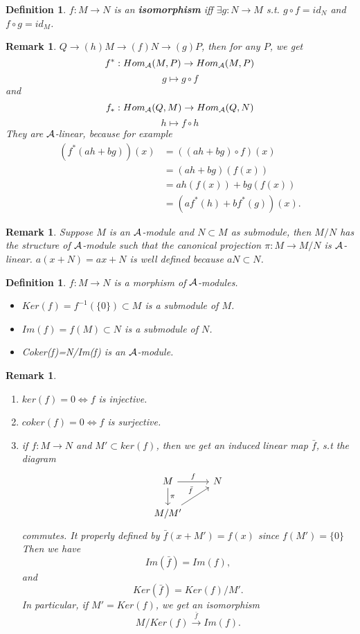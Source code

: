 \documentclass[11pt]{article}
\newtheorem{dfn}[thm]{Definition}
\newtheorem{rmk}[thm]{Remark}
\newcommand{\cala}{{\cal A}}
\newcommand{\rta}{\rightarrow}
\newcommand{\lrta}{\longrightarrow}
\begin{document}
\begin{dfn}
$f:M\rta N$ is an \textbf{isomorphism} iff $\exists g:N\lrta M$ s.t. $g\circ f=id_N$ and $f\circ g=id_M$.
\end{dfn}
\begin{rmk}
$Q\rta(h) M\rta(f) N\rta(g) P$, then for any $P$, we get
 $$
 f^*: Hom_\cala(M,P)\rta Hom_\cala(M,P)
 $$
 $$
g\mapsto g\circ f
 $$
 and 
 $$
 f_*: Hom_\cala(Q,M)\rta Hom_\cala(Q,N)
 $$
 $$
h\mapsto  f\circ h
 $$
They are $\cala$-linear, because for example
$$
\begin{aligned}
(f^*(a h+b g))(x)&=((a h+b g)\circ f) (x)\\
&= (a h+b g) (f(x))\\
&=a h(f(x))+bg(f(x))\\
&= (a f^*(h)+b f^* (g))(x).
\end{aligned}
$$
\end{rmk}

\begin{rmk}
Suppose $M$ is an $\cala$-module and $N\subset M$ as submodule, then $M/N$ has the structure of $\cala$-module such that the canonical projection $\pi: M\rta M/N$ is $\cala$-linear. $a(x+N)=ax+N$ is well defined because $a N\subset N$.
\end{rmk}
\begin{dfn}$f: M\lrta N$ is a morphism of $\cala$-modules.\\
\begin{itemize}
\item 
$
Ker(f)=f^{-1}(\{0\})\subset M
$ 
is a submodule of $M$.
\item 
$
Im(f)= f(M)\subset N
$ is a submodule of $N$.
\item 
Coker(f)=N/Im(f) is an $\cala$-module.
\end{itemize}
\end{dfn}
\begin{rmk}\label{rmk:iso} 
\begin{enumerate}
\item $ker(f)={0}\Longleftrightarrow f$ is injective.
\item $coker(f)={0}\Longleftrightarrow f$ is surjective.
\item if $f:M\rta N$ and $M'\subset ker(f)$, then we get an induced linear map $\bar{f}$, s.t the diagram 
\[
\begin{tikzcd}
M \arrow[r,"f"] \arrow[d,"\pi"]  & N  \\
   M/M' \arrow[ur,"\bar{f}"] & 
\end{tikzcd}
\]
commutes. It properly defined by $\bar{f}(x+M')=f(x)$ since $f(M')=\{0\}$
Then we have
$$
Im(\bar{f})=Im(f),
$$
and 
$$
Ker(\bar{f})=Ker(f)/M'.
$$
In particular, if $M'= Ker(f)$, we get an isomorphism 
$$
M/Ker(f)\overset{\bar{f}}{\lrta}Im(f).
$$
\end{enumerate}
\end{rmk}
\end{document}
